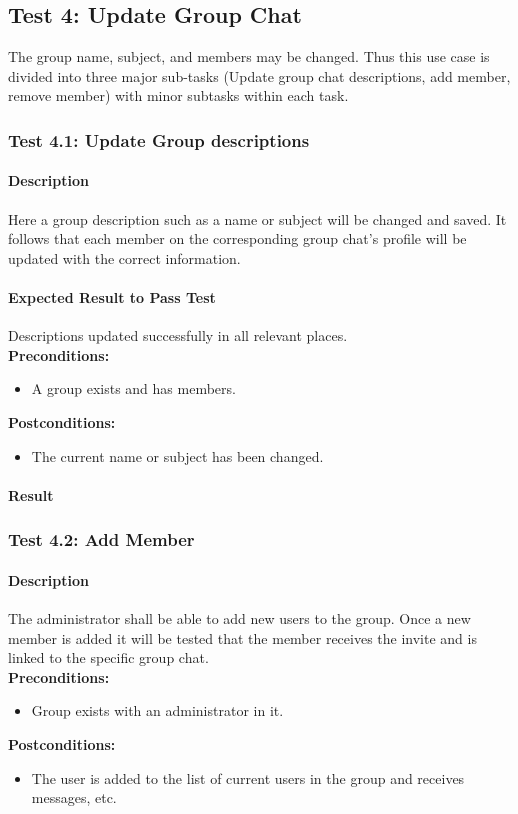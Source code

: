 \documentclass[11pt]{article}
\begin{document}
\subsection{Test 4: Update Group Chat}
The group name, subject, and members may be changed. Thus this use case is divided into three major sub-tasks (Update group chat descriptions, add member, remove member) with minor subtasks within each task.
\subsubsection{Test 4.1: Update Group descriptions}
\paragraph{Description} Here a group description such as a name or subject will be changed and saved. It follows that each member on the corresponding group chat's profile will be updated with the correct information.
\paragraph{Expected Result to Pass Test}
Descriptions updated successfully in all relevant places.\\
\textbf{Preconditions:} 
\begin{itemize}
\item A group exists and has members.
\end{itemize}
\textbf{Postconditions:}
\begin{itemize}
\item The current name or subject has been changed.
\end{itemize}
\paragraph{Result}

\subsubsection{Test 4.2: Add Member}
\paragraph{Description}
The administrator shall be able to add new users to the group. Once a new member is added it will be tested that the member receives the invite and is linked to the specific group chat.\\
\textbf{Preconditions:} 
\begin{itemize}
\item Group exists with an administrator in it.
\end{itemize}
\textbf{Postconditions:}
\begin{itemize}
\item The user is added to the list of current users in the group and receives messages, etc.
\end{itemize}
\end{document}
